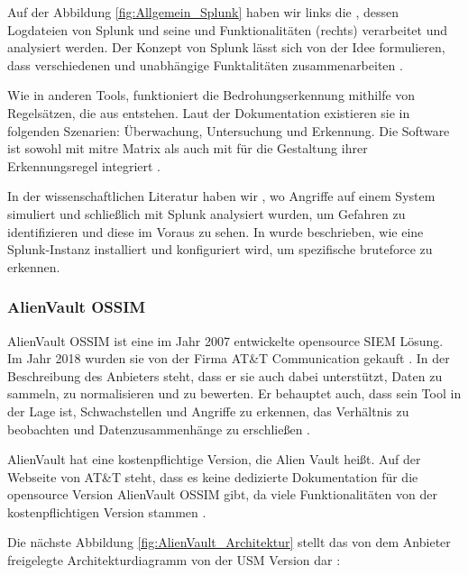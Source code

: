 
Auf der Abbildung \ref{fig:Allgemein_Splunk} haben wir links die , dessen Logdateien von Splunk und seine  und Funktionalitäten (rechts) verarbeitet und analysiert werden. Der Konzept von Splunk lässt sich von der Idee formulieren, dass verschiedenen und unabhängige Funktalitäten zusammenarbeiten \citep{Splunk_platform}.

Wie in anderen Tools, funktioniert die Bedrohungserkennung mithilfe von Regelsätzen, die aus  entstehen. Laut der Dokumentation existieren sie in folgenden Szenarien: Überwachung, Untersuchung und Erkennung. Die Software ist sowohl mit \gls{mitre} Matrix als auch mit  für die Gestaltung ihrer Erkennungsregel integriert \citep{Splunk_usecases}.

In der wissenschaftlichen Literatur haben wir \cite{Su_SplunkDDOS}, wo Angriffe auf einem System simuliert und schließlich mit Splunk analysiert wurden, um Gefahren zu identifizieren und diese im Voraus zu sehen. In \cite{Selvaganesh_SplunkBruteForce} wurde beschrieben, wie eine Splunk-Instanz installiert und konfiguriert wird, um spezifische \gls{bruteforce} zu erkennen.

\subsubsection{AlienVault OSSIM}
AlienVault OSSIM ist eine im Jahr 2007 entwickelte \gls{opensource} \gls{SIEM} Lösung. Im Jahr 2018 wurden sie von der Firma AT\&T Communication gekauft  \citep{CBN_AV}. In der Beschreibung des Anbieters steht, dass er sie auch dabei unterstützt, Daten zu sammeln, zu normalisieren und zu bewerten. Er behauptet auch, dass sein Tool in der Lage ist, Schwachstellen und Angriffe zu erkennen, das Verhältnis zu beobachten und Datenzusammenhänge zu erschließen \citep{ATT_AVO}.

AlienVault hat eine kostenpflichtige Version, die Alien Vault  heißt. Auf der Webseite von AT\&T steht, dass es keine dedizierte Dokumentation für die \gls{opensource} Version AlienVault OSSIM gibt, da viele Funktionalitäten von der kostenpflichtigen Version stammen \citep{ATT_AVO}.

Die nächste Abbildung \ref{fig:AlienVault_Architektur} stellt das von dem Anbieter freigelegte Architekturdiagramm von der \gls{USM} Version dar \citep{ATT_AVO}:

